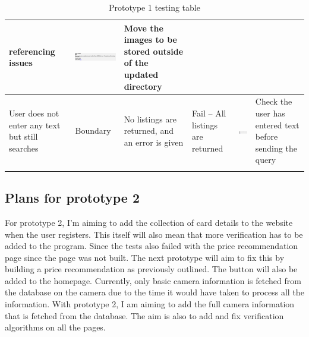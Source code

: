 \begin{center}
\begin{longtable}{|P{17mm}|P{17mm}|P{16mm}|P{17mm}|P{40mm}|P{21.5mm}|}
referencing issues &
\includegraphics[width=38mm]{ch3_developing/proto1/media/image11.png}
& Move the images to be stored outside of the updated directory \\ \hline
User does not enter any text but still searches & Boundary & No listings
are returned, and an error is given & Fail -- All listings are returned
&
\includegraphics[width=38mm]{ch3_developing/proto1/media/image12.png}
& Check the user has entered text before sending the query \\ \hline

    \caption{Prototype 1 testing table}
\label{tab:proto1_testing}
\end{longtable}
\end{center}

\subsection{Plans for prototype 2}
For prototype 2, I’m aiming to add the collection of card details to the website when the user registers. This itself will also mean that more verification has to be added to the program. Since the tests also failed with the price recommendation page since the page was not built. The next prototype will aim to fix this by building a price recommendation as previously outlined. The button will also be added to the homepage. Currently, only basic camera information is fetched from the database on the camera due to the time it would have taken to process all the information. With prototype 2, I am aiming to add the full camera information that is fetched from the database. The aim is also to add and fix verification algorithms on all the pages. 
